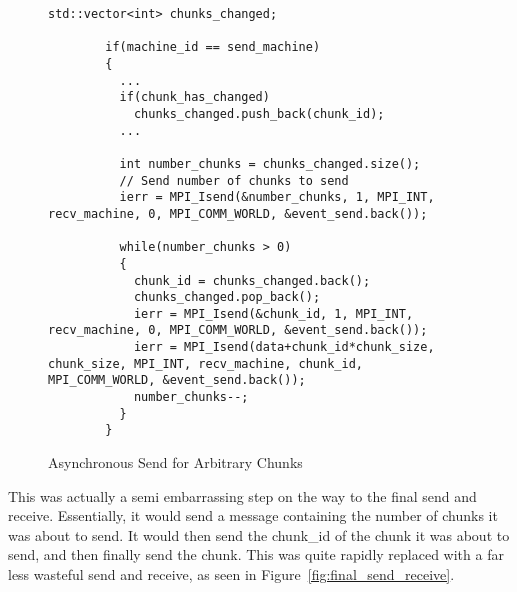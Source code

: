\documentclass[thesis.tex]{subfiles}
\begin{document}
    \begin{figure}[htbp]
      \centering

      \lstset{language=cpp}  
      \begin{lstlisting}[tabsize=2]
        std::vector<int> chunks_changed;

        if(machine_id == send_machine)
        {
          ...
          if(chunk_has_changed)
            chunks_changed.push_back(chunk_id);
          ...

          int number_chunks = chunks_changed.size();
          // Send number of chunks to send
          ierr = MPI_Isend(&number_chunks, 1, MPI_INT, recv_machine, 0, MPI_COMM_WORLD, &event_send.back());

          while(number_chunks > 0)
          {
            chunk_id = chunks_changed.back();
            chunks_changed.pop_back();
            ierr = MPI_Isend(&chunk_id, 1, MPI_INT, recv_machine, 0, MPI_COMM_WORLD, &event_send.back());
            ierr = MPI_Isend(data+chunk_id*chunk_size, chunk_size, MPI_INT, recv_machine, chunk_id, MPI_COMM_WORLD, &event_send.back());
            number_chunks--;
          }
        }
        \end{lstlisting}

      \caption{Asynchronous Send for Arbitrary Chunks}
      \label{fig:async_send_of_arbitrary_chunks}
    \end{figure}

    This was actually a semi embarrassing step on the way to the final send and receive. Essentially, it would send a message containing the number of chunks it was about to send. It would then send the chunk\_id of the chunk it was about to send, and then finally send the chunk. This was quite rapidly replaced with a far less wasteful send and receive, as seen in Figure~\ref{fig:final_send_receive}.
\end{document}
